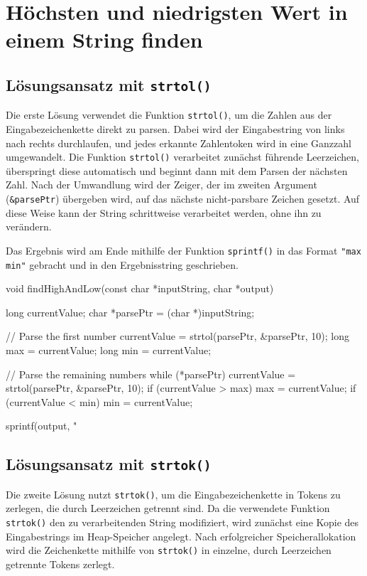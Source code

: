 \chapter{Höchsten und niedrigsten Wert in einem String finden}

\section*{Lösungsansatz mit \texttt{strtol()}}

Die erste Lösung verwendet die Funktion \texttt{strtol()}, um die Zahlen
aus der Eingabezeichenkette direkt zu parsen. Dabei wird der Eingabestring von
links nach rechts durchlaufen, und jedes erkannte Zahlentoken wird in eine
Ganzzahl umgewandelt. Die Funktion \texttt{strtol()} verarbeitet zunächst
führende Leerzeichen, überspringt diese automatisch und beginnt dann mit dem
Parsen der nächsten Zahl. Nach der Umwandlung wird der Zeiger, der im zweiten
Argument (\texttt{&parsePtr}) übergeben wird, auf das nächste
nicht-parsbare Zeichen gesetzt. Auf diese Weise kann der String schrittweise
verarbeitet werden, ohne ihn zu verändern.

Das Ergebnis wird am Ende mithilfe der Funktion \texttt{sprintf()} in
das Format \texttt{"max min"} gebracht und in den Ergebnisstring
geschrieben.

\begin{codebox}[lang=c, fontsize=\small]
void findHighAndLow(const char *inputString, char *output) {
    long currentValue;
    char *parsePtr = (char *)inputString;

    // Parse the first number
    currentValue = strtol(parsePtr, &parsePtr, 10);
    long max = currentValue;
    long min = currentValue;

    // Parse the remaining numbers
    while (*parsePtr) {
        currentValue = strtol(parsePtr, &parsePtr, 10);
        if (currentValue > max) {
            max = currentValue;
        }
        if (currentValue < min) {
            min = currentValue;
        }
    }

    sprintf(output, "%
}
\end{codebox}

\section*{Lösungsansatz mit \texttt{strtok()}}

Die zweite Lösung nutzt \texttt{strtok()}, um die Eingabezeichenkette in
Tokens zu zerlegen, die durch Leerzeichen getrennt sind. Da die verwendete
Funktion \texttt{strtok()} den zu verarbeitenden String modifiziert, wird
zunächst eine Kopie des Eingabestrings im Heap-Speicher angelegt. Nach
erfolgreicher Speicherallokation wird die Zeichenkette mithilfe von
\texttt{strtok()} in einzelne, durch Leerzeichen getrennte Tokens
zerlegt.

